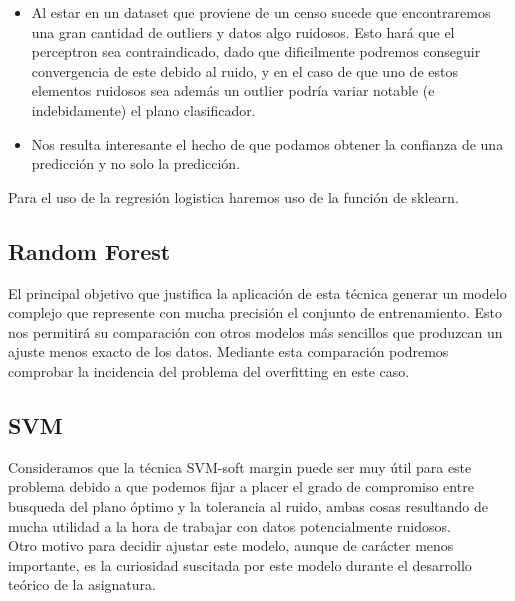 \documentclass[11pt,a4paper]{article}
\begin{document}
	\begin{itemize}
	\item Al estar en un dataset que proviene de un censo sucede que encontraremos una gran cantidad de outliers y datos algo ruidosos. Esto hará que el perceptron sea contraindicado, dado que dificilmente podremos conseguir convergencia de este debido al ruido, y en el caso de que uno de estos elementos ruidosos sea además un outlier podría variar notable (e indebidamente) el plano clasificador.
	\item Nos resulta interesante el hecho de que podamos obtener la confianza de una predicción y no solo la predicción.
\end{itemize}

Para el uso de la regresión logistica haremos uso de la función de sklearn. 

\subsection{Random Forest}

El principal objetivo que justifica la aplicación de esta técnica generar un modelo complejo que represente con mucha precisión el conjunto de entrenamiento. Esto nos permitirá su comparación con otros modelos más sencillos que produzcan un ajuste menos exacto de los datos. Mediante esta comparación podremos comprobar la incidencia del problema del overfitting en este caso.

\subsection{SVM}

Consideramos que la técnica SVM-soft margin puede ser muy útil para este problema debido a que podemos fijar a placer el grado de compromiso entre busqueda del plano óptimo y la tolerancia al ruido, ambas cosas resultando de mucha utilidad a la hora de trabajar con datos potencialmente ruidosos.\\

Otro motivo para decidir ajustar este modelo, aunque de carácter menos importante, es la curiosidad suscitada por este modelo durante el desarrollo teórico de la asignatura. 
\end{document}
